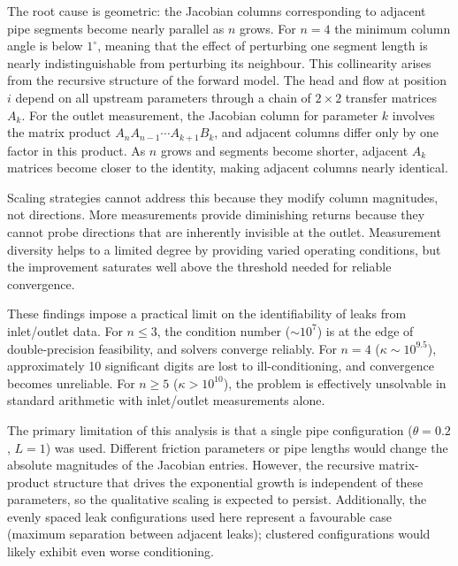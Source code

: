 The root cause is geometric: the Jacobian columns corresponding to adjacent pipe segments become nearly parallel as $n$ grows.
For $n = 4$ the minimum column angle is below $1^\circ$, meaning that the effect of perturbing one segment length is nearly indistinguishable from perturbing its neighbour.
This collinearity arises from the recursive structure of the forward model.
The head and flow at position $i$ depend on all upstream parameters through a chain of $2 \times 2$ transfer matrices $A_k$.
For the outlet measurement, the Jacobian column for parameter $k$ involves the matrix product $A_n A_{n-1} \cdots A_{k+1} B_k$, and adjacent columns differ only by one factor in this product.
As $n$ grows and segments become shorter, adjacent $A_k$ matrices become closer to the identity, making adjacent columns nearly identical.

Scaling strategies cannot address this because they modify column magnitudes, not directions.
More measurements provide diminishing returns because they cannot probe directions that are inherently invisible at the outlet.
Measurement diversity helps to a limited degree by providing varied operating conditions, but the improvement saturates well above the threshold needed for reliable convergence.

These findings impose a practical limit on the identifiability of leaks from inlet/outlet data.
For $n \leq 3$, the condition number ($\sim\! 10^{7}$) is at the edge of double-precision feasibility, and solvers converge reliably.
For $n = 4$ ($\kappa \sim 10^{9.5}$), approximately 10 significant digits are lost to ill-conditioning, and convergence becomes unreliable.
For $n \geq 5$ ($\kappa > 10^{10}$), the problem is effectively unsolvable in standard arithmetic with inlet/outlet measurements alone.

The primary limitation of this analysis is that a single pipe configuration ($\theta = 0.2$, $L = 1$) was used.
Different friction parameters or pipe lengths would change the absolute magnitudes of the Jacobian entries.
However, the recursive matrix-product structure that drives the exponential growth is independent of these parameters, so the qualitative scaling is expected to persist.
Additionally, the evenly spaced leak configurations used here represent a favourable case (maximum separation between adjacent leaks); clustered configurations would likely exhibit even worse conditioning.
